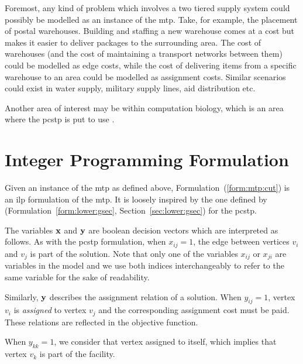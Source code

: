  Foremost, any kind of problem which involves a two tiered supply system could possibly be modelled as an instance of the
 \gls{mtp}. Take, for example, the placement of postal warehouses.
 Building and staffing a new warehouse comes at
 a cost but makes it easier to deliver packages to the surrounding area.
 The cost of warehouses (and the cost of maintaining
 a transport networks between them) could be modelled as edge costs, while the cost of delivering items from a specific warehouse to an area
 could be modelled as assignment costs.  Similar scenarios could exist in water supply, military supply lines, aid distribution etc.

 Another area of interest may be within computation biology, which is an area where the \gls{pcstp} is put to use
 \citep{akhmedov2016divide, sun2018classical}.
\section{Integer Programming Formulation}

Given an instance of the \gls{mtp} as defined above,
Formulation~(\ref{form:mtp:cut}) is an \gls{ilp} formulation of the \gls{mtp}.
It is loosely inspired by the one defined by \citet{lucena2004strong}
(Formulation~\ref{form:lower:gsec}, Section~\ref{sec:lower:gsec}) for the
\gls{pcstp}.

The variables $\mathbf{x}$ and $\mathbf{y}$ are boolean
decision vectors which are interpreted as follows.
As with the \gls{pcstp} formulation, when $x_{ij} = 1$,
the edge between vertices $v_i$ and $v_j$ is part of the solution.
Note that only
one of the variables $x_{ij}$ or $x_{ji}$ are variables
in the model and we use both indices interchangeably
to refer to the same variable for the sake of readability.

Similarly, $\mathbf{y}$ describes the assignment relation of a solution. When
$y_{ij} = 1$, vertex $v_i$ is \textit{assigned} to vertex $v_j$ and the corresponding
assignment cost must be paid.
These relations are reflected in the objective function.

When $y_{kk} = 1$, we consider that vertex assigned to
itself, which implies that vertex $v_k$ is part of the facility.

